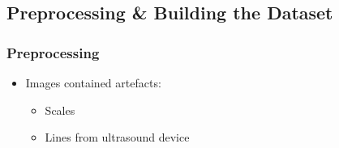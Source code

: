 \documentclass[14pt,mathserif]{beamer}
\begin{document}
\subsection{Preprocessing \& Building the Dataset}

\frame
{
  \frametitle{Preprocessing}

  \setlength{\leftmargini}{0em}
  \setlength{\leftmarginii}{1em}
  \begin{itemize}
     \setlength{\itemsep}{1em}
      \item Images contained artefacts:
        \begin{itemize}
        \item Scales
        \item Lines from ultrasound device
\end{itemize}
\end{itemize}}
\end{document}
